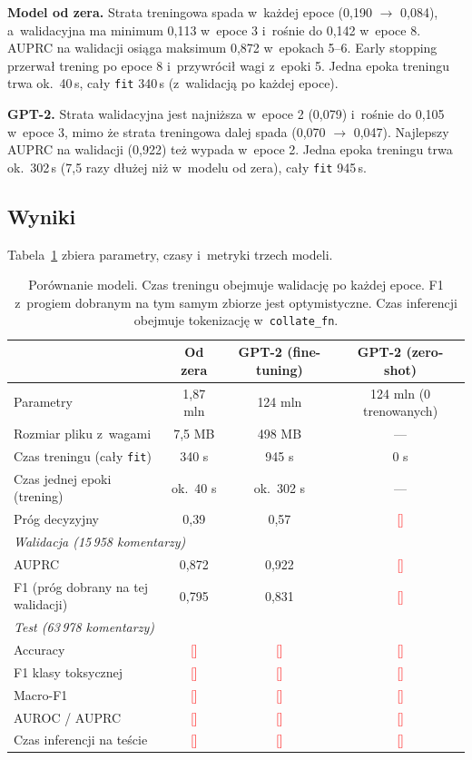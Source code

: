 \documentclass[10pt,a4paper]{article}
\newcommand{\todo}[1]{\textcolor{red}{[#1]}}
\begin{document}
\textbf{Model od zera.} Strata treningowa spada w~każdej epoce (0,190 $\to$ 0,084), a~walidacyjna ma minimum 0,113 w~epoce 3 i~rośnie do 0,142 w~epoce 8. AUPRC na walidacji osiąga maksimum 0,872 w~epokach 5--6. Early stopping przerwał trening po epoce 8 i~przywrócił wagi z~epoki 5. Jedna epoka treningu trwa ok.\ 40\,s, cały \texttt{fit} 340\,s (z~walidacją po każdej epoce).

\textbf{GPT-2.} Strata walidacyjna jest najniższa w~epoce 2 (0,079) i~rośnie do 0,105 w~epoce 3, mimo że strata treningowa dalej spada (0,070 $\to$ 0,047). Najlepszy AUPRC na walidacji (0,922) też wypada w~epoce 2. Jedna epoka treningu trwa ok.\ 302\,s (7,5 razy dłużej niż w~modelu od zera), cały \texttt{fit} 945\,s.

\subsection{Wyniki}

Tabela~\ref{tab:results} zbiera parametry, czasy i~metryki trzech modeli.

\begin{table}[H]
\centering
\small
\setlength{\tabcolsep}{5pt}
\begin{tabular}{lccc}
\toprule
 & Od zera & GPT-2 (fine-tuning) & GPT-2 (zero-shot) \\
\midrule
Parametry                      & 1,87 mln & 124 mln & 124 mln (0 trenowanych) \\
Rozmiar pliku z~wagami         & 7,5 MB & 498 MB & --- \\
Czas treningu (cały \texttt{fit})  & 340 s & 945 s & 0 s \\
Czas jednej epoki (trening)     & ok.\ 40 s & ok.\ 302 s & --- \\
Próg decyzyjny                 & 0,39 & 0,57 & \todo{} \\
\midrule
\multicolumn{4}{l}{\textit{Walidacja (15\,958 komentarzy)}} \\
AUPRC                          & 0,872 & 0,922 & \todo{} \\
F1 (próg dobrany na tej walidacji) & 0,795 & 0,831 & \todo{} \\
\midrule
\multicolumn{4}{l}{\textit{Test (63\,978 komentarzy)}} \\
Accuracy                       & \todo{} & \todo{} & \todo{} \\
F1 klasy toksycznej            & \todo{} & \todo{} & \todo{} \\
Macro-F1                       & \todo{} & \todo{} & \todo{} \\
AUROC / AUPRC                  & \todo{} & \todo{} & \todo{} \\
Czas inferencji na teście      & \todo{} & \todo{} & \todo{} \\
\bottomrule
\end{tabular}
\caption{Porównanie modeli. Czas treningu obejmuje walidację po każdej epoce. F1 z~progiem dobranym na tym samym zbiorze jest optymistyczne. Czas inferencji obejmuje tokenizację w~\texttt{collate\_fn}.}
\label{tab:results}
\end{table}
\end{document}
